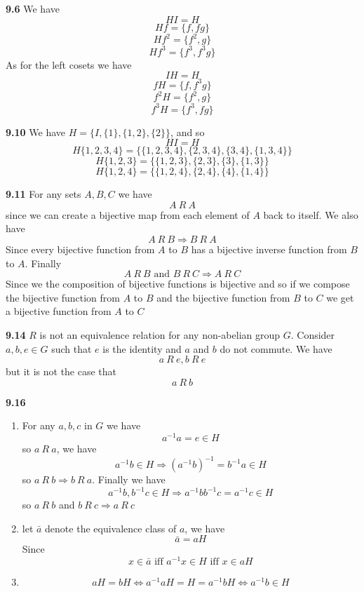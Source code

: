 \documentclass[12pt]{article}
\newenvironment{ques}{\vspace{2 ex}}{\vspace{2 ex}}
\theoremstyle{definition}
\begin{document}
\begin{ques}
	\textbf{9.6}
		We have
		$$HI = H$$
		$$Hf = \{f, fg\}$$
		$$Hf^2 = \{f^2, g\}$$
		$$Hf^3 = \{f^3, f^3g\}$$
		As for the left cosets we have
		$$IH = H$$
		$$fH = \{f, f^3g\}$$
		$$f^2H = \{f^2, g\}$$
		$$f^3H = \{f^3, fg\}$$
\end{ques}

\begin{ques}
	\textbf{9.10}
		We have $H = \{I, \{1\}, \{1, 2\}, \{2\}\}$, and so
		$$HI = H$$
		$$H\{1, 2, 3, 4\} = \{\{1,2,3,4\}, \{2,3,4\},\{3,4\},\{1,3,4\}\}$$
		$$H\{1,2,3\} = \{\{1,2,3\},\{2,3\},\{3\},\{1,3\}\}$$
		$$H\{1,2,4\} = \{\{1,2,4\},\{2,4\},\{4\},\{1,4\}\}$$
\end{ques}

\begin{ques}
	\textbf{9.11}
		For any sets $A, B, C$ we have 
		$$A\ R\ A$$
		since we can create a bijective map from each element of $A$
		back to itself. We also have
		$$A\ R\ B \Rightarrow B\ R\ A$$
		Since every bijective function from $A$ to $B$ has a bijective
		inverse function from $B$ to $A$. Finally
		$$A\ R\ B \text{ and } B\ R\ C \Rightarrow A\ R\ C$$
		Since we the composition of bijective functions is bijective
		and so if we compose the bijective function from $A$ to $B$ and
		the bijective function from $B$ to $C$ we get a bijective
		function from $A$ to $C$
\end{ques}

\begin{ques}
	\textbf{9.14}
		$R$ is not an equivalence relation for any non-abelian group $G$. Consider
		$a,b,e \in G$ such that $e$ is the identity and $a$ and $b$ do
		not commute. We have
		$$a\ R\ e, b\ R\ e$$
		but it is not the case that 
		$$a\ R\ b$$
\end{ques}

\begin{ques}
	\textbf{9.16} 
		\begin{enumerate}
			\item
				For any $a, b, c$ in $G$ we have
				$$a^{-1}a = e \in H$$
				so $a\ R\ a$, we have 
				$$a^{-1}b \in H \Rightarrow (a^{-1}b)^{-1} =
				b^{-1}a \in H$$
				so $a\ R\ b \Rightarrow b\ R\ a$. Finally we have
				$$a^{-1}b, b^{-1}c \in H \Rightarrow
				a^{-1}bb^{-1}c = a^{-1}c \in H$$
				so $a\ R\ b$ and $b\ R\ c \Rightarrow a\ R\ c$
			\item
				let $\bar a$ denote the equivalence class of $a$, we have 
				$$\bar a = aH$$
				Since
				$$x \in \bar a \text{ iff } a^{-1}x \in H
				\text{ iff } x \in aH$$
			\item 
				$$aH = bH \Leftrightarrow a^{-1}aH = H =
				a^{-1}bH \Leftrightarrow a^{-1}b \in H$$

		\end{enumerate}
\end{ques}
\end{document}
